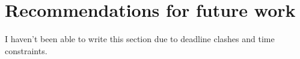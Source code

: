 \chapter{Recommendations for future work}
\begin{tcolorbox}[colback=red!5!white,colframe=red!75!black,title=Not present in draft]
    I haven't been able to write this section due to deadline clashes and time constraints.
\end{tcolorbox}